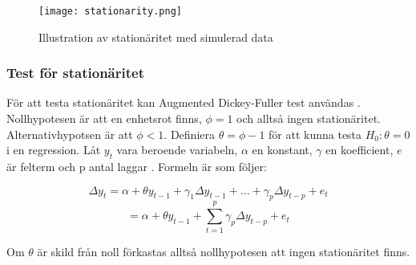 \documentclass[12pt]{article}
\begin{document}
\begin{figure}[H]
\caption{Illustration av stationäritet med simulerad data}
\texttt{[image: stationarity.png]}
\centering
\end{figure}

\subsubsection{Test för stationäritet}
För att testa stationäritet kan Augmented Dickey-Fuller test användas \parencite{dickey1979distribution}. Nollhypotesen är att en enhetsrot finns, \(\phi=1\) och alltså ingen stationäritet. Alternativhypotsen är att \(\phi<1\). Definiera \(\theta = \phi -1 \) för att kunna testa \(H_0:\theta=0\) i en regression. Låt \(y_t\) vara beroende variabeln, \( \alpha \) en konstant, \( \gamma \) en koefficient, \(e\) är felterm och p antal laggar \parencite{wooldridge2018introductory}. Formeln är som följer:

\begin{equation*}
    \Delta y_t = \alpha + \theta y_{t-1} + \gamma_1\Delta y_{t-1} + ... + \gamma_p\Delta y_{t-p} + e_t
\end{equation*}
\begin{equation}
        = \alpha + \theta y_{t-1} + \sum_{t=1}^{p}\gamma_p \Delta y_{t-p} + e_t
\end{equation}

Om \(\theta\) är skild från noll förkastas alltså nollhypotesen att ingen stationäritet finns.
\end{document}

